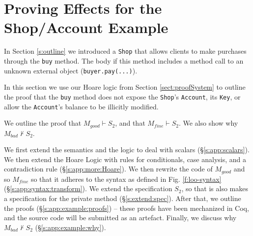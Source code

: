 \newcommand{\STwo}{\ensuremath{S_2}}
\newcommand{\STwoStrong}{\ensuremath{S_{2,strong}}}
\newcommand{\SPT}{~ \strut \hspace{.9cm}}
\newcommand{\Alocals}{\prg{A}_{buy}}
\newcommand{\Alocalsb}{\prg{A}_{1}}
\newcommand{\Ids}{\prg{Ids}_{buy}}
\newcommand{\Alocalstr}{\prg{A}_{trns}}
\newcommand{\Idstr}{\prg{Ids}_{trns}}
\newcommand{\Alocalsset}{\prg{A}_{set}}
\newcommand{\Alocalssets}{\prg{A}_{2}}
\newcommand{\Idsset}{\prg{Ids}_{set}}
\newcommand{\stmtsP}{\prg{stmts}_{10,11,12}}
\newcommand{\step}[1]{ \vspace{.1cm} \noindent {\textbf{#1}}}

\section{  {Proving \Tamed Effects for the Shop/Account Example}}

\label{s:app:example}

In Section \ref{s:outline} we introduced a \verb|Shop| that allows clients to make purchases through the
\verb|buy| method.
The body if this method  includes a method call to an unknown external object (\verb|buyer.pay(...)|).

In this section  we use our Hoare logic from Section \ref{sect:proofSystem} to {outline the proof} that the \verb|buy| method
does not expose the \verb|Shop|'s  \verb|Account|, its \verb|Key|, or allow the \verb|Account|'s balance to be illicitly modified. 

We {outline the proof} that $M_{good} \vdash \STwo$, and that $M_{fine} \vdash \STwo$.
{We  also show why $M_{bad} \not\vdash \STwo$.}

{We first extend the semantics and the logic to deal with scalars (\S \ref{s:app:scalars}). 
We then extend the Hoare Logic with rules for conditionals, case analysis, and a contradiction rule
(\S \ref{s:app:more:Hoare}).
We then rewrite the code of $M_{good}$ and so $M_{fine}$
so that it adheres to the syntax as defined in Fig. \ref{f:loo-syntax} (\S \ref{s:app:syntax:transform}). 
We  extend the specification $\STwo$, so that is also makes a specification for the private method  (\S \ref{s:extend:spec}). 
After that, we outline the proofs (\S \ref{s:app:example:proofs}) --
these proofs have been mechanized in Coq, and the source code will be
submitted as an artefact. %
Finally, we discuss why $M_{bad} \not\vdash \STwo$ (\S \ref{s:app:example:why}).}


